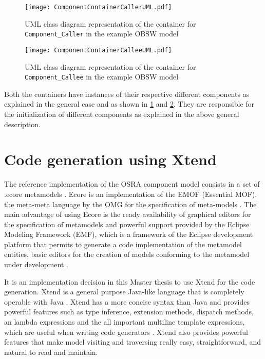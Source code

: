 \begin{figure}[h]
	\centering
	\texttt{[image: ComponentContainerCallerUML.pdf]}
	\caption{UML class diagram representation of the container for \texttt{Component\allowbreak \_Caller} in the example OBSW model}
	\label{fig: Component container caller UML}
\end{figure}

\begin{figure}[h]
	\centering
	\texttt{[image: ComponentContainerCalleeUML.pdf]}
	\caption{UML class diagram representation of the container for \texttt{Component\allowbreak \_Callee} in the example OBSW model}
	\label{fig: Component container callee UML}
\end{figure}

Both the containers have instances of their respective different components as explained in the general case and as shown in \cref{fig: Component container caller UML} and \cref{fig: Component container callee UML}. They are responsible for the initialization of different components as explained in the above general description.  

\section{Code generation using Xtend}
\label{section: code generation}
The reference implementation of the OSRA component model consists in a set of .ecore metamodels \cite{SpecMetamodel}. Ecore is an implementation of the EMOF (Essential MOF), the meta-meta language by the OMG for the specification of meta-models \cite{SpecMetamodel}. The main advantage of using Ecore is the ready availability of graphical editors for the specification of metamodels and powerful support provided by the Eclipse Modeling Framework (EMF), which is a framework of the Eclipse development platform that permits to generate a code implementation of the metamodel entities, basic editors for the creation of models conforming to the metamodel under development \cite{SpecMetamodel}. 

It is an implementation decision in this Master thesis to use Xtend for the code generation. Xtend is a general purpose Java-like language that is completely operable with Java \cite{Xtend}\cite{XtendDoc}. Xtend has a more concise syntax than Java and provides powerful features such as type inference, extension methods, dispatch methods, an lambda expressions and the all important multiline template expressions, which are useful when writing code generators \cite{Xtend}\cite{XtendDoc}. Xtend also provides powerful features that make model visiting and traversing really easy, straightforward, and natural to read and maintain. 

